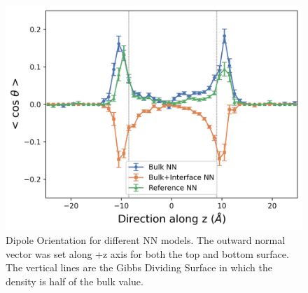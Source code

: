 \begin{figure}[tbhp!]
	\centering
	\includegraphics[width=0.75\linewidth]{images/dipole_dist_new.png}
	\caption{Dipole Orientation for different NN models. The outward normal
		vector was set along +z axis for both the top and bottom
		surface. The vertical
		lines
		are
		the Gibbs Dividing Surface in which the density is half of the
		bulk value.
	}
	\label{fig:dipole_orient}
\end{figure}


\clearpage
